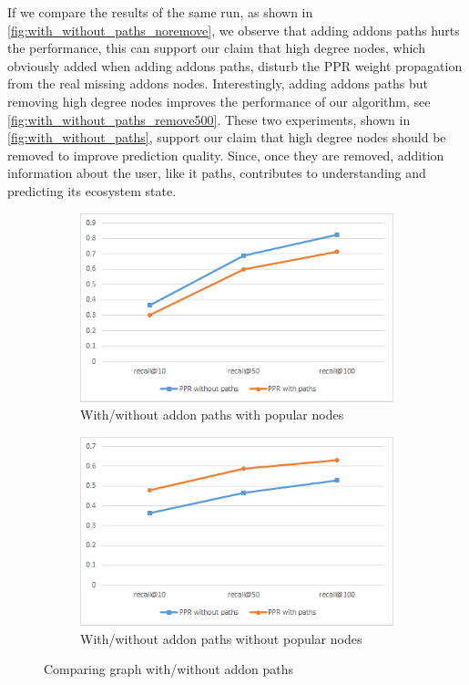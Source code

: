 \documentclass[11pt,oneside]{book}
\begin{document}
If we compare the results of the same run, as shown in \autoref{fig:with_without_paths_noremove}, we observe that adding addons paths hurts the performance, this can support our claim that high degree nodes, which obviously added when adding addons paths, disturb the PPR weight propagation from the real missing addons nodes. Interestingly, adding addons paths but removing high degree nodes improves the performance of our algorithm, see \autoref{fig:with_without_paths_remove500}. These two experiments, shown in \autoref{fig:with_without_paths}, support our claim that high degree nodes should be removed to improve prediction quality. Since, once they are removed, addition information about the user, like it paths, contributes to understanding and predicting its ecosystem state.

\begin{figure}[h]
\centering
\begin{subfigure}[b]{0.49\textwidth}
	\centering
\includegraphics[scale=0.49]{figures/minlen2noremoveCompPaths.png}
\caption{With/without addon paths with popular nodes}
\label{fig:with_without_paths_noremove}
\end{subfigure}
\begin{subfigure}[b]{0.49\textwidth}
	\centering
\includegraphics[scale=0.49]{figures/minlen5remove500CompPaths.png}
\caption{With/without addon paths without popular nodes}
\label{fig:with_without_paths_remove500}
\end{subfigure}
\caption{Comparing graph with/without addon paths}
	\label{fig:with_without_paths}
\end{figure}
\end{document}
